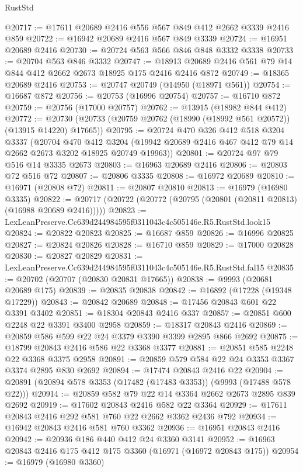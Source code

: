 \begin{lexlean}{RustStd}
\begin{coremodule}
@20717 := @17611 @20689 @2416 @556 @567 @849 @412 @2662 @3339 @2416 @859
@20722 := @16942 @20689 @2416 @567 @849 @3339
@20724 := @16951 @20689 @2416
@20730 := @20724 @563 @566 @846 @848 @3332 @3338
@20733 := @20704 @563 @846 @3332
@20747 := @18913 @20689 @2416 @561 @79 @14 @844 @412 @2662 @2673 @18925 @175 @2416 @2416 @872
@20749 := @18365 @20689 @2416
@20753 := @20747 @20749 (@14950 (@18971 @561))
@20754 := @16687 @872
@20756 := @20753 (@16996 @20754)
@20757 := @16710 @872
@20759 := @20756 (@17000 @20757)
@20762 := @13915 (@18982 @844 @412)
@20772 := @20730 (@20733 (@20759 @20762 (@18990 (@18992 @561 @20572)) (@13915 @14220) @17665))
@20795 := @20724
    @470
    @326
    @412
    @518
    @3204
    @3337
    (@20704
      @470
      @412
      @3204
      (@19942 @20689 @2416 @467 @412 @79 @14 @2662 @2673 @3202 @18925 @20749 @19963))
@20801 := @20724 @97 @79 @516 @14 @3335 @2673
@20803 := @16963 @20689 @2416
@20806 := @20803 @72 @516 @72
@20807 := @20806 @3335
@20808 := @16972 @20689
@20810 := @16971 (@20808 @72)
@20811 := @20807 @20810
@20813 := @16979 (@16980 @3335)
@20822 := @20717 (@20722 (@20772 (@20795 (@20801 (@20811 @20813) (@16988 @20689 @2416)))))
@20823 := LexLeanPreserve.Cc639d244984595f0311043c4c505146e.R5.RustStd.look15
@20824 := @20822 @20823
@20825 := @16687 @859
@20826 := @16996 @20825
@20827 := @20824 @20826
@20828 := @16710 @859
@20829 := @17000 @20828
@20830 := @20827 @20829
@20831 := LexLeanPreserve.Cc639d244984595f0311043c4c505146e.R5.RustStd.fal15
@20835 := @20702 (@20707 (@20830 @20831 @17665))
@20838 := @9993 (@20681 @20689 @175)
@20839 := @20835 @20838
@20842 := @16892 (@17228 (@19348 @17229))
@20843 := @20842 @20689
@20848 := @17456 @20843 @601 @22 @3391 @3402
@20851 := @18304 @20843 @2416 @337
@20857 := @20851 @600 @2248 @22 @3391 @3400 @2958
@20859 := @18317 @20843 @2416
@20869 := @20859 @586 @599 @22 @24 @3379 @3390 @3399 @2895 @866 @2692
@20875 := @18799 @20843 @2416 @586 @22 @3368 @3377
@20881 := @20851 @585 @2248 @22 @3368 @3375 @2958
@20891 := @20859 @579 @584 @22 @24 @3353 @3367 @3374 @2895 @830 @2692
@20894 := @17474 @20843 @2416 @22
@20904 := @20891 (@20894 @578 @3353 (@17482 (@17483 @3353)) (@9993 (@17488 @578 @22)))
@20914 := @20859 @582 @79 @22 @14 @3364 @2662 @2673 @2895 @839 @2692
@20919 := @17602 @20843 @2416 @582 @22 @3364
@20929 := @17611 @20843 @2416 @292 @581 @760 @22 @2662 @3362 @2436 @792
@20934 := @16942 @20843 @2416 @581 @760 @3362
@20936 := @16951 @20843 @2416
@20942 := @20936 @186 @440 @412 @24 @3360 @3141
@20952 := @16963 @20843 @2416 @175 @412 @175 @3360 (@16971 (@16972 @20843 @175))
@20954 := @16979 (@16980 @3360)

\end{coremodule}
\end{lexlean}
